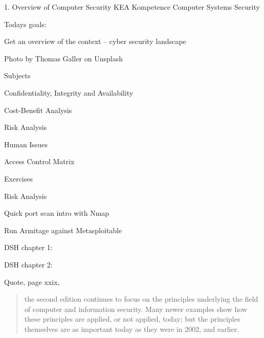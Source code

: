 \documentclass[Screen16to9,17pt]{foils}
\begin{document}
\mytitlepage
{1. Overview of Computer Security}
{KEA Kompetence Computer Systems Security \the\year}



Todays goals:
\begin{list2}
\item Get an overview of the context -- cyber security landscape
\end{list2}

  Photo by Thomas Galler on Unsplash


\begin{list1}
\item Subjects
\begin{list2}
\item Confidentiality, Integrity and Availability
\item Cost-Benefit Analysis
\item Risk Analysis
\item Human Issues
\item Access Control Matrix
\end{list2}
\item Exercises
\begin{list2}
\item Risk Analysis
\item Quick port scan intro with Nmap
\item Run Armitage against Metasploitable
\end{list2}
\end{list1}




\begin{list1}
\item DSH chapter 1:
\item DSH chapter 2:
\end{list1}

Quote, page xxix,\\
\begin{quote}
the second edition continues to focus on the principles underlying the field of computer and information security. Many newer examples show how these principles are applied, or not applied, today; but the principles themselves are as important today as they were in 2002, and earlier.
\end{quote}
\end{document}

